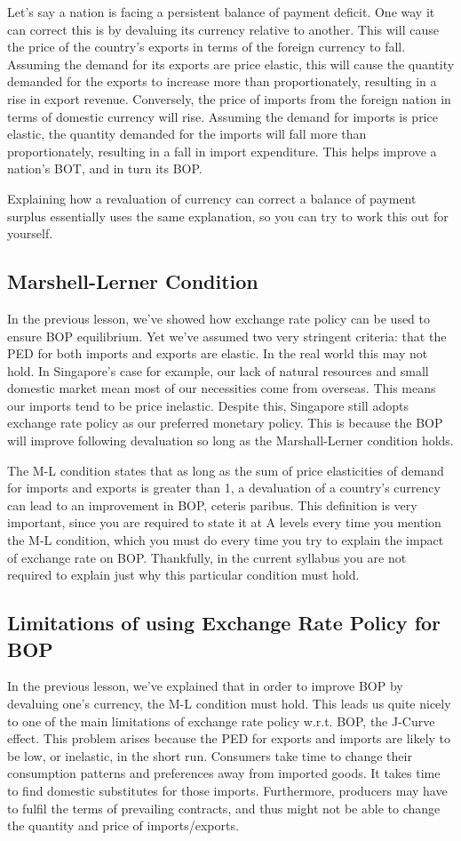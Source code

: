 Let's say a nation is facing a persistent balance of payment deficit. One way it can correct this is by devaluing its currency relative to another. This will cause the price of the country's exports in terms of the foreign currency to fall. Assuming the demand for its exports are price elastic, this will cause the quantity demanded for the exports to increase more than proportionately, resulting in a rise in export revenue. Conversely, the price of imports from the foreign nation in terms of domestic currency will rise. Assuming the demand for imports is price elastic, the quantity demanded for the imports will fall more than proportionately, resulting in a fall in import expenditure. This helps improve a nation's BOT, and in turn its BOP.

Explaining how a revaluation of currency can correct a balance of payment surplus essentially uses the same explanation, so you can try to work this out for yourself.
\subsection{Marshell-Lerner Condition}
In the previous lesson, we've showed how exchange rate policy can be used to ensure BOP equilibrium. Yet we've assumed two very stringent criteria: that the PED for both imports and exports are elastic. In the real world this may not hold. In Singapore's case for example, our lack of natural resources and small domestic market mean most of our necessities come from overseas. This means our imports tend to be price inelastic. Despite this, Singapore still adopts exchange rate policy as our preferred monetary policy. This is because the BOP will improve following devaluation so long as the Marshall-Lerner condition holds.

The M-L condition states that as long as the sum of price elasticities of demand for imports and exports is greater than 1, a devaluation of a country's currency can lead to an improvement in BOP, ceteris paribus. This definition is very important, since you are required to state it at A levels every time you mention the M-L condition, which you must do every time you try to explain the impact of exchange rate on BOP. Thankfully, in the current syllabus you are not required to explain just why this particular condition must hold.
\subsection{Limitations of using Exchange Rate Policy for BOP}
In the previous lesson, we've explained that in order to improve BOP by devaluing one's currency, the M-L condition must hold. This leads us quite nicely to one of the main limitations of exchange rate policy w.r.t. BOP, the J-Curve effect. This problem arises because the PED for exports and imports are likely to be low, or inelastic, in the short run. Consumers take time to change their consumption patterns and preferences away from imported goods. It takes time to find domestic substitutes for those imports. Furthermore, producers may have to fulfil the terms of prevailing contracts, and thus might not be able to change the quantity and price of imports/exports.

